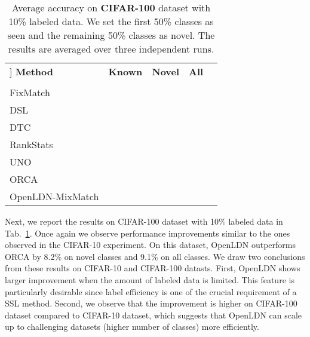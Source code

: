 \documentclass[runningheads]{eccv2022submission}
\begin{document}
\begin{table}[h]
\begin{center}\setlength{\tabcolsep}{2pt}
\small
\begin{tabular}{lcccc}
\hline

\hline

\hline\-3mm]
\textbf{Method} & \textbf{Known} & \textbf{Novel} & \textbf{All}\\
[-3mm]
\\
 \hline

\hline

\hline
FixMatch\cite{sohn2020fixmatch} &  &  & \\
DSL\cite{guo2020safe} &  &  & \\
DTC\cite{han2019learning} &  &  & \\
RankStats\cite{Han2020Automatically} &  &  & \\
UNO\cite{fini2021unified} &  &  & \\
ORCA\cite{cao2022openworld} &  &  & \\
\rowcolor[gray]{.95} {OpenLDN-MixMatch} & {\tiny{\textcolor{teal}{}}} & {\tiny{\textcolor{teal}{}}} & {\tiny{\textcolor{teal}{}}}\\ 
\hline 

\hline

\hline
\end{tabular}
\end{center}
\small
\caption{Average accuracy on \textbf{CIFAR-100} dataset with 10\% labeled data. We set the first 50\% classes as seen and the remaining 50\% classes as novel. The results are averaged over three independent runs.}
\label{tab:cifar100}
\end{table}


Next, we report the results on CIFAR-100 dataset with 10\% labeled data in Tab.~\ref{tab:cifar100}. Once again we observe performance improvements similar to the ones observed in the CIFAR-10 experiment. On this dataset, OpenLDN outperforms ORCA\cite{cao2022openworld} by 8.2\% on novel classes and 9.1\% on all classes. We draw two conclusions from these results on CIFAR-10 and CIFAR-100 datasts. First, OpenLDN shows larger improvement when the amount of labeled data is limited. This feature is particularly desirable since label efficiency is one of the crucial requirement of a SSL method. Second, we observe that the improvement is higher on CIFAR-100 dataset compared to CIFAR-10 dataset, which suggests that OpenLDN can scale up to challenging datasets (higher number of classes) more efficiently.      
\end{document}
